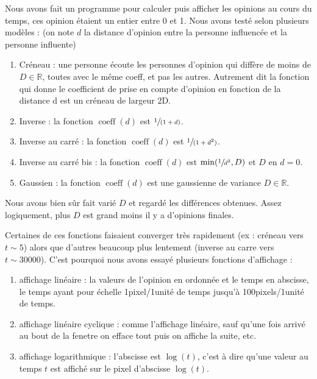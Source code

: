\documentclass[a4paper,10pt]{article}
\begin{document}
Nous avons fait un programme pour calculer puis afficher les opinions au cours du temps, ces opinion étaient un entier entre 0 et 1. Nous avons testé selon plusieurs modèles : (on note $d$ la distance d'opinion entre la personne influencée et la personne influente)
\begin{enumerate}
\item Créneau : une personne écoute les personnes d'opinion qui diffère de moins de $D \in \mathbb{R}$, toutes avec le même coeff, et pas les autres. Autrement dit la fonction qui donne le coefficient de prise en compte d'opinion en fonction de la distance d est un créneau de largeur 2D.

\item Inverse : la fonction $\operatorname{coeff}(d)$ est $\sfrac{1}{(1+d)}$.

\item Inverse au carré : la fonction $\operatorname{coeff}(d)$ est $\sfrac{1}{(1+d^2)}$.

\item Inverse au carré bis : la fonction $\operatorname{coeff}(d)$ est $\min(\sfrac{1}{d^2}, D)$ et $D$ en $d=0$.

\item Gaussien : la fonction $\operatorname{coeff}(d)$ est une gaussienne de variance $D \in \mathbb{R}$.
\end{enumerate}

Nous avons bien sûr fait varié $D$ et regardé les différences obtenues. Assez logiquement, plus $D$ est grand moins il y a d'opinions finales.

Certaines de ces fonctions faisaient converger très rapidement (ex : créneau vers $t \sim 5$) alors que d'autres beaucoup plus lentement (inverse au carre vers $t \sim 30000$). C'est pourquoi nous avons essayé plusieurs fonctions d'affichage :
\begin{enumerate}
\item affichage linéaire : la valeurs de l'opinion en ordonnée et le temps en abscisse, le temps ayant pour échelle 1pixel/1unité de temps jusqu'à 100pixels/1unité de temps.

\item affichage linéaire cyclique : comme l'affichage linéaire, sauf qu'une fois arrivé au bout de la fenetre on efface tout puis on affiche la suite, etc.

\item affichage logarithmique : l'abscisse est $\log(t)$, c'est à dire qu'une valeur au temps $t$ est affiché sur le pixel d'abscisse $\log(t)$.
\end{enumerate}
\end{document}
